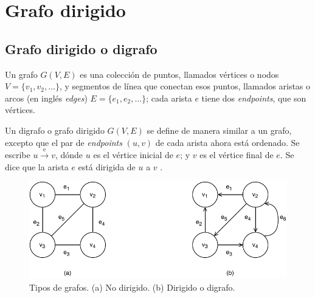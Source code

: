 \section{Grafo dirigido}\label{DirectedGraph}
\subsection{Grafo dirigido o digrafo}
Un grafo \( G(V,E) \) es una colección de puntos, llamados vértices o nodos \( V = \{ v_1, v_2, \dots \} \), y segmentos de línea que conectan esos puntos, llamados aristas o arcos (en inglés \textit{edges}) \( E = \{ e_1, e_2, \dots \} \); cada arista \( e \) tiene dos \textit{\gls{endpoints}}, que son vértices.

Un digrafo o grafo dirigido \( G(V,E) \) se define de manera similar a un grafo, excepto que el par de \textit{\gls{endpoints}} \( (u, v) \) de cada arista ahora está ordenado. Se escribe \( u \xrightarrow{\text{e}} v \), dónde \( u \) es el vértice inicial de \( e \); y \( v \) es el vértice final de \( e \). Se dice que la arista \( e \) está dirigida de \( u \) a \( v \) \cite{book:even2011graph}.

\begin{figure}[H]
	\centering
	\includegraphics[width=0.8\linewidth]{doc/DirectedGraph/img/directed-undirected-graph}
	\caption{Tipos de grafos. (a) No dirigido. (b) Dirigido o digrafo. }
	\label{fig:directed-undirected-graph}
\end{figure}